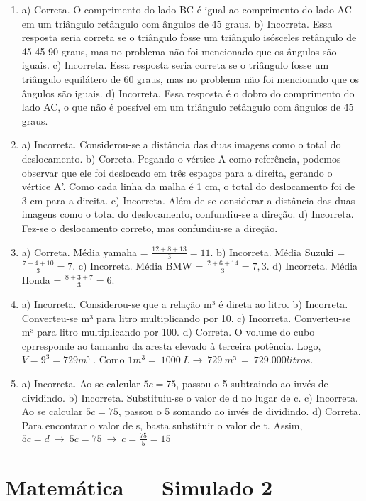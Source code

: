 \begin{enumerate}
\item a) Correta. O comprimento do lado BC é igual ao comprimento do lado AC em um triângulo retângulo com ângulos de 45 graus.
b) Incorreta. Essa resposta seria correta se o triângulo fosse um triângulo isósceles retângulo de 45-45-90 graus, mas no problema não foi mencionado que os ângulos são iguais.
c) Incorreta. Essa resposta seria correta se o triângulo fosse um triângulo equilátero de 60 graus, mas no problema não foi mencionado que os ângulos são iguais.
d) Incorreta. Essa resposta é o dobro do comprimento do lado AC, o que não é possível em um triângulo retângulo com ângulos de 45 graus.


\item a) Incorreta. Considerou-se a distância das duas imagens como o total do deslocamento.
b) Correta. Pegando o vértice A como referência, podemos observar que ele foi deslocado em três espaços para a direita, gerando o vértice
A'. Como cada linha da malha é 1 cm, o total do deslocamento foi de 3 cm para a direita.
c) Incorreta. Além de se considerar a distância das duas imagens como o total do deslocamento, confundiu-se a direção.
d) Incorreta. Fez-se o deslocamento correto, mas confundiu-se a direção.

\item a) Correta.
Média yamaha =  $\frac{12 + 8 + 13}{3} = 11$.
b) Incorreta.
Média Suzuki  =  $\frac{7 + 4 + 10}{3} = 7$.
c) Incorreta.
Média BMW =  $\frac{2 + 6 + 14}{3} = 7,3$.
d) Incorreta.
Média Honda = $\frac{8 + 3 + 7}{3} = 6$.


\item a) Incorreta. Considerou-se que a relação m³ é direta ao litro.
b) Incorreta. Converteu-se m³ para litro multiplicando por 10.
c) Incorreta. Converteu-se m³ para litro multiplicando por 100.
d) Correta. O volume do cubo cprresponde ao tamanho da aresta elevado à terceira potência. Logo, $V = 9^{3} = 729m³$ . Como
$1m^{3} = \ 1000\ L \rightarrow \ 729\ m³\  = \ 729.000 litros$.


\item a) Incorreta. Ao se calcular $5c = 75$, passou o 5 subtraindo ao invés de dividindo.
b) Incorreta. Substituiu-se o valor de d no lugar de c.
c) Incorreta. Ao se calcular $5c = 75$, passou o 5 somando ao invés de dividindo.
d) Correta. Para encontrar o valor de s, basta substituir o valor de t. Assim, $5c = d\  \rightarrow \ 5c = 75\  \rightarrow \ c = \frac{75}{5} = 15$
\end{enumerate}

\section*{Matemática — Simulado 2}


